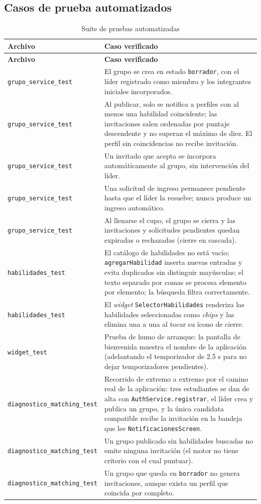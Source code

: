 \documentclass[12pt,a4paper]{article}
\begin{document}
\subsection{Casos de prueba automatizados}
\begin{longtable}{L{3.4cm}L{10.4cm}}
\caption{Suite de pruebas automatizadas}\label{tab:tests}\\
\toprule
\textbf{Archivo} & \textbf{Caso verificado} \\
\midrule
\endfirsthead
\toprule
\textbf{Archivo} & \textbf{Caso verificado} \\
\midrule
\endhead
\bottomrule
\endfoot
\texttt{grupo\_service\_test} & El grupo se crea en estado \texttt{borrador}, con el líder registrado como miembro y los integrantes iniciales incorporados. \\
\texttt{grupo\_service\_test} & Al publicar, solo se notifica a perfiles con al menos una habilidad coincidente; las invitaciones salen ordenadas por puntaje descendente y no superan el máximo de diez. El perfil sin coincidencias no recibe invitación. \\
\texttt{grupo\_service\_test} & Un invitado que acepta se incorpora automáticamente al grupo, sin intervención del líder. \\
\texttt{grupo\_service\_test} & Una solicitud de ingreso permanece pendiente hasta que el líder la resuelve; nunca produce un ingreso automático. \\
\texttt{grupo\_service\_test} & Al llenarse el cupo, el grupo se cierra y las invitaciones y solicitudes pendientes quedan expiradas o rechazadas (cierre en cascada). \\
\texttt{habilidades\_test} & El catálogo de habilidades no está vacío; \texttt{agregarHabilidad} inserta nuevas entradas y evita duplicados sin distinguir mayúsculas; el texto separado por comas se procesa elemento por elemento; la búsqueda filtra correctamente. \\
\texttt{habilidades\_test} & El \emph{widget} \texttt{SelectorHabilidades} renderiza las habilidades seleccionadas como \emph{chips} y las elimina una a una al tocar su ícono de cierre. \\
\texttt{widget\_test} & Prueba de humo de arranque: la pantalla de bienvenida muestra el nombre de la aplicación (adelantando el temporizador de 2.5 s para no dejar temporizadores pendientes). \\
\texttt{diagnostico\_matching\_test} & Recorrido de extremo a extremo por el camino real de la aplicación: tres estudiantes se dan de alta con \texttt{AuthService.registrar}, el líder crea y publica un grupo, y la única candidata compatible recibe la invitación en la bandeja que lee \texttt{NotificacionesScreen}. \\
\texttt{diagnostico\_matching\_test} & Un grupo publicado sin habilidades buscadas no emite ninguna invitación (el motor no tiene criterio con el cual puntuar). \\
\texttt{diagnostico\_matching\_test} & Un grupo que queda en \texttt{borrador} no genera invitaciones, aunque exista un perfil que coincida por completo. \\
\end{longtable}
\end{document}
